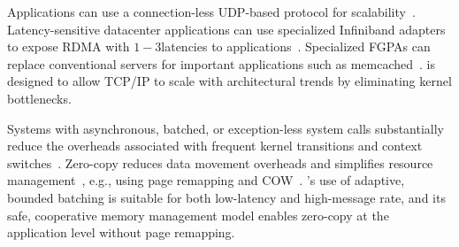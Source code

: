  Applications can
use a connection-less UDP-based protocol for
scalability~\cite{nishtala2013scaling}.  Latency-sensitive datacenter
applications can use specialized Infiniband adapters to expose RDMA
with $1-3$\microsecond latencies to
applications~\cite{DBLP:conf/sosp/OngaroRSOR11,Jose:2011:MDH,mitchell:rdma,dragojevic14farm}.
Specialized FGPAs can replace conventional servers for important
applications such as
memcached~\cite{DBLP:conf/fpga/ChalamalasettiLWARM13,HPHA:Tanaka:2014,179402}.
\ix is designed to allow TCP/IP to scale with architectural trends by
eliminating kernel bottlenecks.


Systems with asynchronous, batched, or exception-less system calls
substantially reduce the overheads associated with frequent kernel
transitions and context switches~\cite{
  soares2010flexsc,han2012megapipe,rizzo2012netmap,jeong2014mtcp}.
Zero-copy reduces data movement overheads and simplifies resource
management~\cite{DBLP:journals/tocs/PaiDZ00}, e.g., using page remapping and COW~\cite{solaris_zc}.
\ix's use of adaptive,
bounded batching is suitable for both low-latency and high-message
rate, and its safe, cooperative memory management model enables
zero-copy at the application level without page remapping. 


